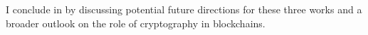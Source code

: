 I conclude in  by discussing potential future directions for these three works and a broader outlook on the role of cryptography in blockchains. 






